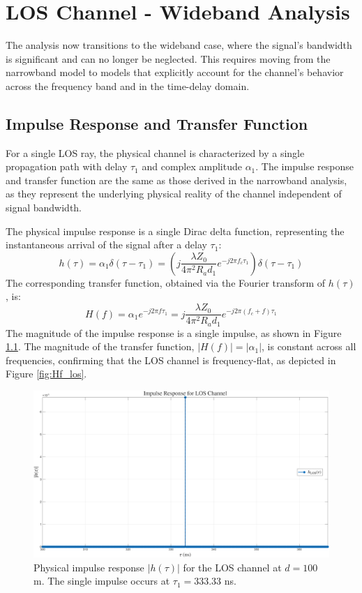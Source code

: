 \chapter{LOS Channel - Wideband Analysis}
\label{chap:los_wide}

The analysis now transitions to the wideband case, where the signal's bandwidth is significant and can no longer be neglected. This requires moving from the narrowband model to models that explicitly account for the channel's behavior across the frequency band and in the time-delay domain.

\section{Impulse Response and Transfer Function}
For a single LOS ray, the physical channel is characterized by a single propagation path with delay $\tau_1$ and complex amplitude $\alpha_1$. The impulse response and transfer function are the same as those derived in the narrowband analysis, as they represent the underlying physical reality of the channel independent of signal bandwidth.

The physical impulse response is a single Dirac delta function, representing the instantaneous arrival of the signal after a delay $\tau_1$:
\begin{equation}
	h(\tau) = \alpha_1 \delta(\tau - \tau_1) = \left( j \frac{\lambda Z_0}{4\pi^2 R_a d_1} e^{-j2\pi f_c \tau_1} \right) \delta(\tau - \tau_1)
	\label{eq:los_impulse_response_wide}
\end{equation}
The corresponding transfer function, obtained via the Fourier transform of $h(\tau)$, is:
\begin{equation}
	H(f) = \alpha_1 e^{-j2\pi f \tau_1} = j \frac{\lambda Z_0}{4\pi^2 R_a d_1} e^{-j2\pi (f_c + f) \tau_1}
	\label{eq:los_transfer_function_wide}
\end{equation}
The magnitude of the impulse response is a single impulse, as shown in Figure \ref{fig:h_tau_los}. The magnitude of the transfer function, $|H(f)| = |\alpha_1|$, is constant across all frequencies, confirming that the LOS channel is frequency-flat, as depicted in Figure \ref{fig:Hf_los}.

\begin{figure}
	\includegraphics[width=\linewidth]{"content/4-images/h-tau-LOS.png"}
	\caption{Physical impulse response $|h(\tau)|$ for the LOS channel at $d=100$ m. The single impulse occurs at $\tau_1 = 333.33$ ns.}
	\label{fig:h_tau_los}
\end{figure}

